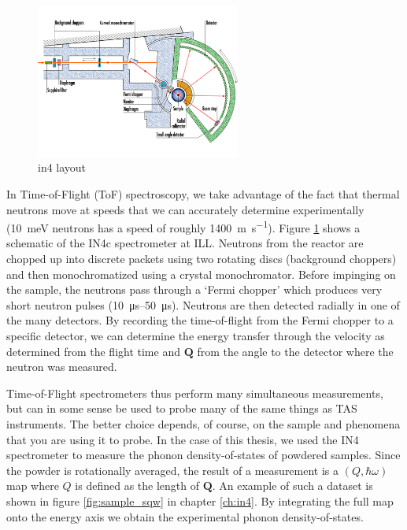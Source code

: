 \begin{figure}
	\centering
	\includegraphics[width=0.6\textwidth]{fig/method/ns/in4.jpg}
	\caption[in4 layout]{in4 layout \cite{in4}}
	\label{fig:in4}
\end{figure}

In Time-of-Flight (ToF) spectroscopy, we take advantage of the fact that thermal neutrons move at speeds that we can accurately determine experimentally (\SI{10}{\milli\eV} neutrons has a speed of roughly \SI{1400}{\meter\per\second}). Figure \ref{fig:in4} shows a schematic of the IN4c spectrometer at ILL. Neutrons from the reactor are chopped up into discrete packets using two rotating discs (background choppers) and then monochromatized using a crystal monochromator. Before impinging on the sample, the neutrons pass through a `Fermi chopper' which produces very short neutron pulses (\SIrange{10}{50}{\micro\second}). Neutrons are then detected radially in one of the many detectors. By recording the time-of-flight from the Fermi chopper to a specific detector, we can determine the energy transfer through the velocity as determined from the flight time and $\bm{Q}$ from the angle to the detector where the neutron was measured.

Time-of-Flight spectrometers thus perform many simultaneous measurements, but can in some sense be used to probe many of the same things as TAS instruments. The better choice depends, of course, on the sample and phenomena that you are using it to probe. In the case of this thesis, we used the IN4 spectrometer to measure the phonon density-of-states of powdered samples. Since the powder is rotationally averaged, the result of a measurement is a $(Q,\hbar\omega)$ map where $Q$ is defined as the length of $\bm{Q}$. An example of such a dataset is shown in figure \ref{fig:sample_sqw} in chapter \ref{ch:in4}. By integrating the full map onto the energy axis we obtain the experimental phonon density-of-states.

